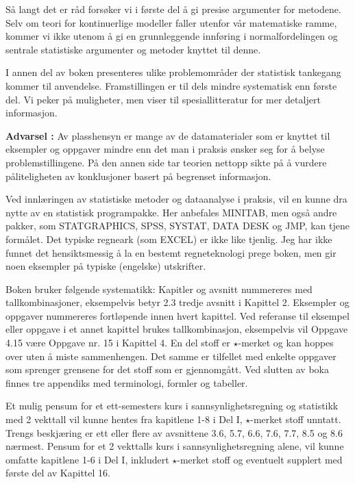 Så langt det er råd forsøker vi i første del å gi presise
argumenter for metodene. Selv om teori for kontinuerlige modeller faller
utenfor vår matematiske ramme, kommer vi ikke utenom å gi
en grunnleggende innføring i normalfordelingen og sentrale statistiske
argumenter og metoder knyttet til denne.

I annen del av boken presenteres ulike problemområder der 
statistisk tankegang kommer til anvendelse.  Framstillingen
er til dels mindre syste\-matisk enn første del. Vi peker på muligheter,
men viser til spesiallitteratur for mer detaljert informasjon.

 {\bf Advarsel :} Av plasshensyn er mange av de datamaterialer som er
knyttet til eksempler og oppgaver mindre enn det man i praksis ønsker seg
for å belyse problemstillingene. På den annen side tar teorien
nettopp sikte på å vurdere påliteligheten av konklusjoner
basert på begrenset informasjon.

Ved innlæringen av statistiske metoder og dataanalyse i praksis, vil
en kunne dra nytte av en statistisk programpakke. Her anbefales MINITAB,
men også andre pakker, som STATGRAPHICS, SPSS, SYSTAT, DATA DESK og JMP,
kan tjene formålet. Det typiske regneark (som EXCEL) er ikke like tjenlig.
Jeg har ikke funnet det hensiktsmessig å la en bestemt regneteknologi
prege boken, men gir noen eksempler på typiske (engelske) utskrifter.

Boken bruker følgende systematikk:  Kapitler og avsnitt nummereres 
med tallkombinasjoner, eksempelvis betyr 2.3 tredje avsnitt i Kapittel 2.
Eksempler og oppgaver nummereres fortløpende innen hvert kapittel. 
Ved referanse til eksempel eller oppgave i et annet kapittel brukes
tallkombinasjon, eksempelvis vil Oppgave 4.15 være Oppgave nr. 15 i
Kapittel 4.  En del stoff er $\star$-merket og kan hoppes over uten å miste
sammenhengen.  Det samme er tilfellet med enkelte oppgaver som sprenger
grensene for det stoff som er gjennomgått.  Ved slutten av boka finnes
tre appendiks med terminologi, formler og tabeller.


Et mulig pensum for et ett-semesters kurs i sannsynlighetsregning og
statistikk med 2 vekttall vil kunne hentes fra
kapitlene 1-8 i Del I, $\star$-merket stoff unntatt. Trengs 
beskjæring er ett eller flere av avsnittene 3.6, 5.7, 6.6, 7.6, 7.7, 8.5
og 8.6 nærmest. Pensum for et 2 vekttalls kurs i sannsynlighets\-regning
alene, vil kunne omfatte kapitlene 1-6 i Del I, inkludert $\star$-merket stoff 
og eventuelt supplert med første del av Kapittel 16.

